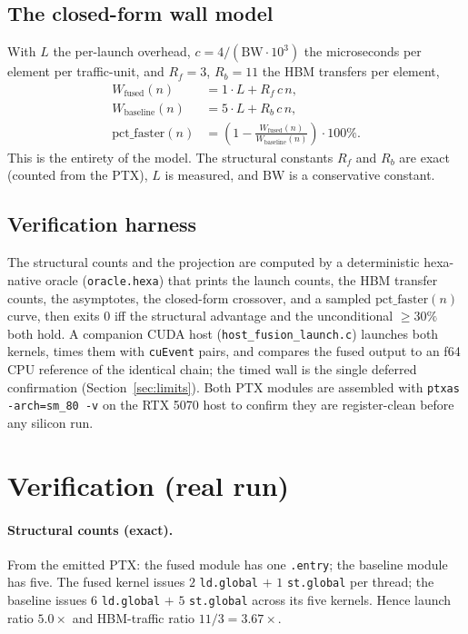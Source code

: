 \documentclass[11pt,a4paper]{article}
\begin{document}
\subsection{The closed-form wall model}

With $L$ the per-launch overhead, $c = 4/(\mathrm{BW}\cdot 10^3)$ the
microseconds per element per traffic-unit, and $R_f = 3$, $R_b = 11$ the HBM
transfers per element,
\begin{align}
  W_{\text{fused}}(n)    &= 1\cdot L + R_f\, c\, n, \\
  W_{\text{baseline}}(n) &= 5\cdot L + R_b\, c\, n, \\
  \mathrm{pct\_faster}(n) &= \left(1 - \frac{W_{\text{fused}}(n)}{W_{\text{baseline}}(n)}\right)\cdot 100\%.
\end{align}
This is the entirety of the model. The structural constants $R_f$ and $R_b$ are
exact (counted from the PTX), $L$ is measured, and $\mathrm{BW}$ is a
conservative constant.

\subsection{Verification harness}

The structural counts and the projection are computed by a deterministic
hexa-native oracle (\texttt{oracle.hexa}) that prints the launch counts, the
HBM transfer counts, the asymptotes, the closed-form crossover, and a sampled
$\mathrm{pct\_faster}(n)$ curve, then exits $0$ iff the structural advantage and
the unconditional $\ge 30\%$ both hold. A companion CUDA host
(\texttt{host\_fusion\_launch.c}) launches both kernels, times them with
\texttt{cuEvent} pairs, and compares the fused output to an f64 CPU reference of
the identical chain; the timed wall is the single deferred confirmation
(Section~\ref{sec:limits}). Both PTX modules are assembled with
\texttt{ptxas -arch=sm\_80 -v} on the RTX 5070 host to confirm they are
register-clean before any silicon run.

\section{Verification (real run)}
\label{sec:verification}

\paragraph{Structural counts (exact).} From the emitted PTX: the fused module
has one \texttt{.entry}; the baseline module has five. The fused kernel issues
$2$ \texttt{ld.global} $+$ $1$ \texttt{st.global} per thread; the baseline
issues $6$ \texttt{ld.global} $+$ $5$ \texttt{st.global} across its five
kernels. Hence launch ratio $5.0\times$ and HBM-traffic ratio
$11/3 = 3.67\times$.
\end{document}
